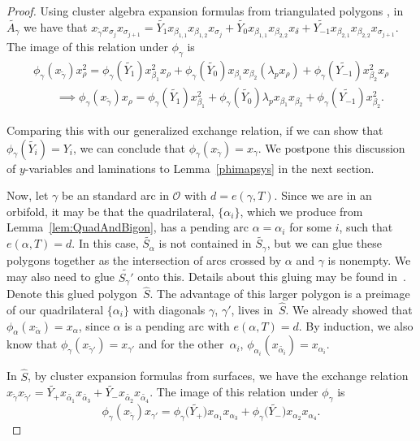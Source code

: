 \begin{proof}
Using cluster algebra expansion formulas from triangulated polygons \cite{MSW}, in $\widetilde{A_\gamma}$ we have that $x_{\widetilde{\gamma}}x_{\sigma_j}x_{\sigma_{j+1}} = \widetilde{Y_1} x_{\beta_{1,1}}x_{\beta_{1,2}}x_{\sigma_j} + \widetilde{Y_0} x_{\beta_{1,1}}x_{\beta_{2,2}}x_{\delta} + \widetilde{Y_{-1}}x_{\beta_{2,1}}x_{\beta_{2,2}}x_{\sigma_{j+1}}$. The image of this relation under $\phi_\gamma$ is
\begin{gather}
\phi_\gamma(x_{\widetilde{\gamma}})x_{\rho}^2 = \phi_\gamma(\widetilde{Y_1}) x_{\beta_1}^2x_{\rho} + \phi_\gamma(\widetilde{Y_0}) x_{\beta_1}x_{\beta_2}(\lambda_px_\rho)+ \phi_\gamma(\widetilde{Y_{-1}})x_{\beta_2}^2x_{\rho}\nonumber
\\
\qquad{} \implies\phi_\gamma(x_{\widetilde{\gamma}})x_{\rho} = \phi_\gamma(\widetilde{Y_1}) x_{\beta_1}^2 +\phi_\gamma(\widetilde{Y_0}) \lambda_px_{\beta_1}x_{\beta_2}+ \phi_\gamma(\widetilde{Y_{-1}})x_{\beta_2}^2.\label{genmutate}
\end{gather}

Comparing this with our generalized exchange relation, if we can show that $\phi_\gamma(\widetilde{Y_i}) = Y_i$, we can conclude that $\phi_\gamma(x_{\widetilde{\gamma}}) = x_\gamma$. We postpone this discussion of $y$-variables and laminations to Lemma~\ref{phimapsys} in the next section.

Now, let $\gamma$ be an standard arc in $\mathcal{O}$ with $d = e(\gamma, T)$. Since we are in an orbifold, it may be that the quadrilateral, $\{\alpha_i\}$, which we produce from Lemma~\ref{lem:QuadAndBigon}, has a pending arc $\alpha = \alpha_i$ for some $i$, such that $e(\alpha,T) = d$. In this case, $\widetilde{S_\alpha}$ is not contained in $\widetilde{S_\gamma}$, but we can glue these polygons together as the intersection of arcs crossed by $\alpha$ and $\gamma$ is nonempty. We may also need to glue $\widetilde{S_\gamma'}$ onto this. Details about this gluing may be found in~\cite{MSW}. Denote this glued polygon~$\hat{S}$. The advantage of this larger polygon is a preimage of our quadrilateral $\{\alpha_i\}$ with diagonals $\gamma$, $\gamma'$, lives in~$\hat{S}$. We already showed that $\phi_\alpha(x_{\widetilde{\alpha}}) = x_\alpha$, since $\alpha$ is a pending arc with $e(\alpha,T) = d$. By induction, we also know that $\phi_{\gamma}(x_{\widetilde{\gamma}'}) = x_{\gamma'}$ and for the other~$\alpha_i$, $\phi_{\alpha_i}(x_{\widetilde{\alpha_i}}) = x_{\alpha_i}$.

In $\hat{S}$, by cluster expansion formulas from surfaces, we have the exchange relation $x_{\widetilde{\gamma}} x_{\widetilde{\gamma}'}= \widetilde{Y_+}x_{\widetilde{\alpha_1}}x_{\widetilde{\alpha_3}} + \widetilde{Y_-}x_{\widetilde{\alpha_2}}x_{\widetilde{\alpha_4}}$. The image of this relation under $\phi_\gamma$ is \[
\phi_\gamma(x_{\widetilde{\gamma}}) x_{\gamma'} = \phi_\gamma\big(\widetilde{Y_+}\big)x_{\alpha_1}x_{\alpha_3} + \phi_\gamma\big(\widetilde{Y_-}\big)x_{\alpha_2}x_{\alpha_4}.
\]


\end{proof}

